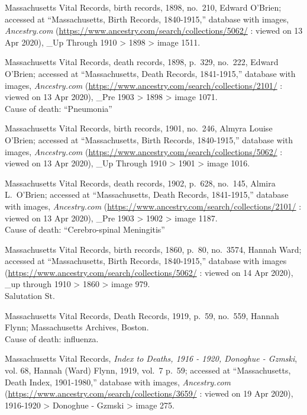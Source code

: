 \begin{thebibliography}{999}
	Massachusetts Vital Records, birth records, 1898, no.\ 210, Edward O'Brien; accessed at ``Massachusetts, Birth Records, 1840-1915,'' database with images, \textit{Ancestry.com} (\url{https://www.ancestry.com/search/collections/5062/} : viewed on 13 Apr 2020), \_Up Through 1910 > 1898 > image 1511.
	
	Massachusetts Vital Records, death records, 1898, p.\ 329, no.\ 222, Edward O'Brien; accessed at ``Massachusetts, Death Records, 1841-1915,'' database with images, \textit{Ancestry.com} (\url{https://www.ancestry.com/search/collections/2101/} : viewed on 13 Apr 2020), \_Pre 1903 > 1898 > image 1071.\\
	Cause of death: ``Pneumonia''
	
	Massachusetts Vital Records, birth records, 1901, no.\ 246, Almyra Louise O'Brien; accessed at ``Massachusetts, Birth Records, 1840-1915,'' database with images, \textit{Ancestry.com} (\url{https://www.ancestry.com/search/collections/5062/} : viewed on 13 Apr 2020), \_Up Through 1910 > 1901 > image 1016.
	
	Massachusetts Vital Records, death records, 1902, p.\ 628, no.\ 145, Almira L.\ O'Brien; accessed at ``Massachusetts, Death Records, 1841-1915,'' database with images, \textit{Ancestry.com} (\url{https://www.ancestry.com/search/collections/2101/} : viewed on 13 Apr 2020), \_Pre 1903 > 1902 > image 1187.\\
	Cause of death: ``Cerebro-spinal Meningitis''
	
	Massachusetts Vital Records, birth records, 1860, p.\ 80, no.\ 3574, Hannah Ward; accessed at ``Massachusetts, Birth Records, 1840-1915,'' database with images (\url{https://www.ancestry.com/search/collections/5062/} : viewed on 14 Apr 2020), \_up through 1910 > 1860 > image 979.\\
	Salutation St.
	
	Massachusetts Vital Records, Death Records, 1919, p.\ 59, no.\ 559, Hannah Flynn; Massachusetts Archives, Boston.\\
	Cause of death: influenza.
	
	Massachusetts Vital Records, \textit{Index to Deaths, 1916 - 1920, Donoghue - Gzmski}, vol. 68, Hannah (Ward) Flynn, 1919, vol.\ 7 p.\ 59; accessed at ``Massachusetts, Death Index, 1901-1980,'' database with images, \textit{Ancestry.com} (\url{https://www.ancestry.com/search/collections/3659/} : viewed on 19 Apr 2020), 1916-1920 > Donoghue - Gzmski > image 275.
	

\end{thebibliography}
